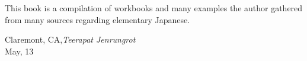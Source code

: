 %
%
%

\preface

This book is a compilation of workbooks and many examples the author gathered from many sources regarding elementary Japanese.

\vspace{1cm}
\begin{flushright}\noindent
Claremont, CA,\hfill {\it Teerapat Jenrungrot}\\
May, 13\hfill\\
\end{flushright}


